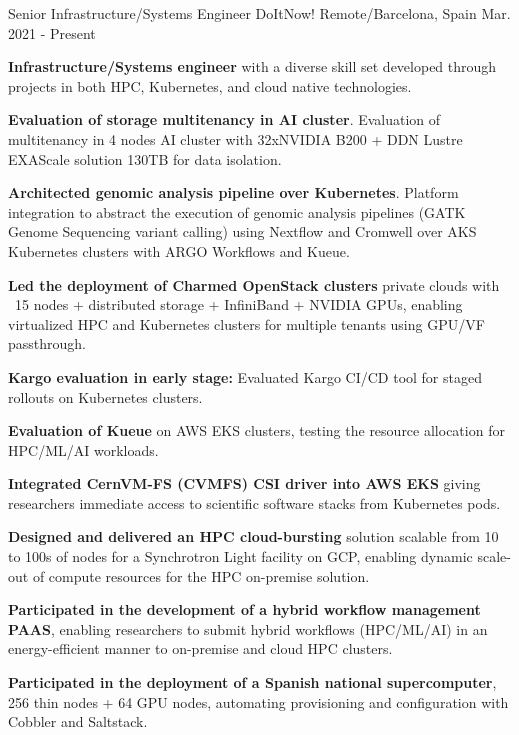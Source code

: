 \begin{cventries}
\cventry
{Senior Infrastructure/Systems Engineer} %
{DoItNow!} %
{Remote/Barcelona, Spain} %
{Mar. 2021 - Present} %
{ %
\begin{cvitems}
\item{\textbf{Infrastructure/Systems engineer} with a diverse skill set developed through projects in both HPC, Kubernetes, and cloud native technologies.}
\item{\textbf{Evaluation of storage multitenancy in AI cluster}. Evaluation of multitenancy in 4 nodes AI cluster with 32xNVIDIA B200 + DDN Lustre EXAScale solution 130TB for data isolation.}
\item{\textbf{Architected genomic analysis pipeline over Kubernetes}. Platform integration to abstract the execution of genomic analysis pipelines (GATK Genome Sequencing variant calling) using Nextflow and Cromwell over AKS Kubernetes clusters with ARGO Workflows and Kueue.}
\item{\textbf{Led the deployment of Charmed OpenStack clusters} private clouds with ~15 nodes + distributed storage + InfiniBand + NVIDIA GPUs, enabling virtualized HPC and Kubernetes clusters for multiple tenants using GPU/VF passthrough.}
\item{\textbf{Kargo evaluation in early stage:} Evaluated Kargo CI/CD tool for staged rollouts on Kubernetes clusters.}
\item{\textbf{Evaluation of Kueue} on AWS EKS clusters, testing the resource allocation for HPC/ML/AI workloads.}
\item{\textbf{Integrated CernVM-FS (CVMFS) CSI driver into AWS EKS} giving researchers immediate access to scientific software stacks from Kubernetes pods.}
\item{\textbf{Designed and delivered an HPC cloud-bursting} solution scalable from 10 to 100s of nodes for a Synchrotron Light facility on GCP, enabling dynamic scale-out of compute resources for the HPC on-premise solution.}
\item{\textbf{Participated in the development of a hybrid workflow management PAAS}, enabling researchers to submit hybrid workflows (HPC/ML/AI) in an energy-efficient manner to on-premise and cloud HPC clusters.}
\item{\textbf{Participated in the deployment of a Spanish national supercomputer}, 256 thin nodes + 64 GPU nodes, automating provisioning and configuration with Cobbler and Saltstack.}

\end{cvitems}}
\end{cventries}
